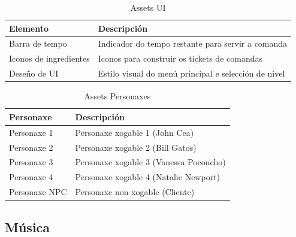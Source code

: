 \documentclass{report}  %
\begin{document}
\begin{table}[h]
    \centering
    \renewcommand{\arraystretch}{1.3} %
    \setlength{\tabcolsep}{10pt} %
    \label{tab:ui}
    \begin{tabular}{|p{4cm}|p{9cm}|}
        \hline
        \rowcolor{octopus} %
        \textbf{Elemento}  & \textbf{Descripción} \\
        \hline
        Barra de tempo & Indicador do tempo restante para servir a comanda \\
        \hline
        Iconos de ingredientes & Iconos para construir os tickets de comandas \\
        \hline
        Deseño de UI & Estilo visual do menú principal e selección de nivel \\
        \hline
    \end{tabular}
    \caption{Assets UI}
\end{table}


\begin{table}[h]
    \centering
    \renewcommand{\arraystretch}{1.3} %
    \setlength{\tabcolsep}{10pt} %
    \label{tab:personaxes}
    \begin{tabular}{|p{4cm}|p{9cm}|}
        \hline
        \rowcolor{octopus} %
        \textbf{Personaxe}  & \textbf{Descripción} \\
        \hline
        Personaxe 1 & Personaxe xogable 1 (John Cea) \\
        \hline
        Personaxe 2 & Personaxe xogable 2 (Bill Gatos) \\
        \hline
        Personaxe 3 & Personaxe xogable 3 (Vanessa Poconcho) \\
        \hline
        Personaxe 4 & Personaxe xogable 4 (Natalie Newport) \\
        \hline
        Personaxe NPC & Personaxe non xogable (Cliente) \\
        \hline
    \end{tabular}
    \caption{Assets Personaxes}
\end{table}

\newpage
\subsection{Música}
\end{document}
